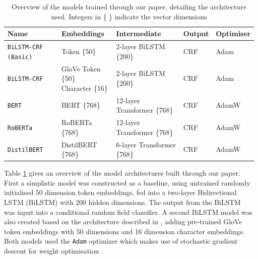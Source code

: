 \documentclass[]{interact}
\theoremstyle{plain}%
\theoremstyle{definition}
\theoremstyle{remark}
\begin{document}
\begin{table}

\caption{\label{tab:models}Overview of the models trained through our paper, detailing the architecture used. Integers in \{ \} indicate the vector dimensions}
\centering
\fontsize{9}{11}\selectfont
\begin{tabular}[t]{lllll}
\toprule
\textbf{Name} & \textbf{Embeddings} & \textbf{Intermediate} & \textbf{Output} & \textbf{Optimiser}\\
\midrule
\texttt{BiLSTM-CRF (Basic)} & Token \{50\} & 2-layer BiLSTM \{200\} & CRF & Adam\\
\texttt{BiLSTM-CRF} & \makecell[l]{GloVe Token \{50\}\\ Character \{16\}} & 2-layer BiLSTM \{200\} & CRF & Adam\\
\texttt{BERT} & BERT \{768\} & 12-layer Transformer \{768\} & CRF & AdamW\\
\texttt{RoBERTa} & RoBERTa \{768\} & 12-layer Transformer \{768\} & CRF & AdamW\\
\texttt{DistilBERT} & DistilBERT \{768\} & 6-layer Transformer \{768\} & CRF & AdamW\\
\bottomrule
\end{tabular}
\end{table}

Table \ref{tab:models} gives an overview of the model architectures
built through our paper. First a simplistic model was constructed as a
baseline, using untrained randomly initialised 50 dimension token
embeddings, fed into a two-layer Bidirectional LSTM (BiLSTM) with 200
hidden dimensions. The output from the BiLSTM was input into a
conditional random field classifier. A second BiLSTM model was also
created based on the architecture described in \citet{peters2018},
adding pre-trained GloVe token embeddings \citep{pennington2014} with 50
dimensions and 16 dimension character embeddings. Both models used the
\texttt{Adam} optimizer which makes use of stochastic gradient descent
for weight optimisation \citep{kingma2017}.
\end{document}
